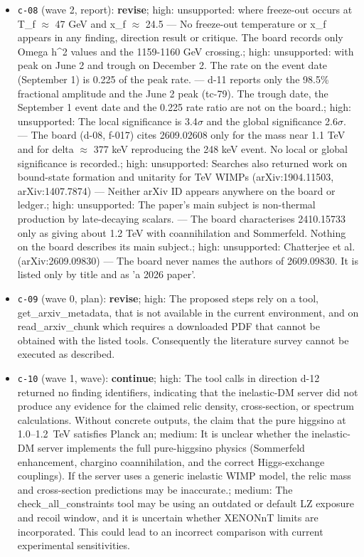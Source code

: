 \documentclass[11pt,a4paper]{article}
\begin{document}
\begin{itemize}
  \item \texttt{c-08} (wave 2, report): \textbf{revise}; high: unsupported: where freeze-out occurs at T\_f $\approx$ 47 GeV and x\_f $\approx$ 24.5 --- No freeze-out temperature or x\_f appears in any finding, direction result or critique. The board records only Omega h\textasciicircum{}2 values and the 1159-1160 GeV crossing.; high: unsupported: with peak on June 2 and trough on December 2. The rate on the event date (September 1) is 0.225 of the peak rate. --- d-11 reports only the 98.5\% fractional amplitude and the June 2 peak (tc-79). The trough date, the September 1 event date and the 0.225 rate ratio are not on the board.; high: unsupported: The local significance is 3.4$\sigma$ and the global significance 2.6$\sigma$. --- The board (d-08, f-017) cites 2609.02608 only for the mass near 1.1 TeV and for delta $\approx$ 377 keV reproducing the 248 keV event. No local or global significance is recorded.; high: unsupported: Searches also returned work on bound-state formation and unitarity for TeV WIMPs (arXiv:1904.11503, arXiv:1407.7874) --- Neither arXiv ID appears anywhere on the board or ledger.; high: unsupported: The paper's main subject is non-thermal production by late-decaying scalars. --- The board characterises 2410.15733 only as giving about 1.2 TeV with coannihilation and Sommerfeld. Nothing on the board describes its main subject.; high: unsupported: Chatterjee et al. (arXiv:2609.09830) --- The board never names the authors of 2609.09830. It is listed only by title and as 'a 2026 paper'.
  \item \texttt{c-09} (wave 0, plan): \textbf{revise}; high: The proposed steps rely on a tool, get\_arxiv\_metadata, that is not available in the current environment, and on read\_arxiv\_chunk which requires a downloaded PDF that cannot be obtained with the listed tools. Consequently the literature survey cannot be executed as described.
  \item \texttt{c-10} (wave 1, wave): \textbf{continue}; high: The tool calls in direction d-12 returned no finding identifiers, indicating that the inelastic-DM server did not produce any evidence for the claimed relic density, cross-section, or spectrum calculations. Without concrete outputs, the claim that the pure higgsino at 1.0--1.2~TeV satisfies Planck an; medium: It is unclear whether the inelastic-DM server implements the full pure-higgsino physics (Sommerfeld enhancement, chargino coannihilation, and the correct Higgs-exchange couplings). If the server uses a generic inelastic WIMP model, the relic mass and cross-section predictions may be inaccurate.; medium: The check\_all\_constraints tool may be using an outdated or default LZ exposure and recoil window, and it is uncertain whether XENONnT limits are incorporated. This could lead to an incorrect comparison with current experimental sensitivities.

\end{itemize}
\end{document}

